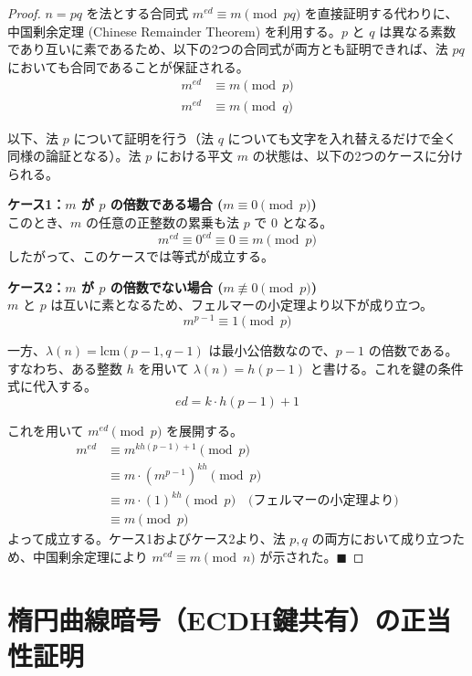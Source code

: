 \documentclass[11pt,a4paper]{ltjsarticle}
\newtheorem{proof}{証明}
\begin{document}
\begin{proof}
$n=pq$ を法とする合同式 $m^{ed} \equiv m \pmod{pq}$ を直接証明する代わりに、中国剰余定理 (Chinese Remainder Theorem) を利用する。$p$ と $q$ は異なる素数であり互いに素であるため、以下の2つの合同式が両方とも証明できれば、法 $pq$ においても合同であることが保証される。
\begin{align}
  m^{ed} &\equiv m \pmod{p} \\
  m^{ed} &\equiv m \pmod{q}
\end{align}

以下、法 $p$ について証明を行う（法 $q$ についても文字を入れ替えるだけで全く同様の論証となる）。法 $p$ における平文 $m$ の状態は、以下の2つのケースに分けられる。

\vspace{1em}
\noindent\textbf{ケース1：$m$ が $p$ の倍数である場合 ($m \equiv 0 \pmod{p}$)} \\
このとき、$m$ の任意の正整数の累乗も法 $p$ で $0$ となる。
\[ m^{ed} \equiv 0^{ed} \equiv 0 \equiv m \pmod{p} \]
したがって、このケースでは等式が成立する。

\vspace{1em}
\noindent\textbf{ケース2：$m$ が $p$ の倍数でない場合 ($m \not\equiv 0 \pmod{p}$)} \\
$m$ と $p$ は互いに素となるため、フェルマーの小定理より以下が成り立つ。
\[ m^{p-1} \equiv 1 \pmod{p} \]

一方、$\lambda(n) = \mathrm{lcm}(p-1, q-1)$ は最小公倍数なので、$p-1$ の倍数である。すなわち、ある整数 $h$ を用いて $\lambda(n) = h(p-1)$ と書ける。これを鍵の条件式に代入する。
\[ ed = k \cdot h(p-1) + 1 \]

これを用いて $m^{ed} \pmod{p}$ を展開する。
\begin{align*}
  m^{ed} &\equiv m^{kh(p-1) + 1} \pmod{p} \\
         &\equiv m \cdot (m^{p-1})^{kh} \pmod{p} \\
         &\equiv m \cdot (1)^{kh} \pmod{p} \quad \text{(フェルマーの小定理より)} \\
         &\equiv m \pmod{p}
\end{align*}
よって成立する。ケース1およびケース2より、法 $p, q$ の両方において成り立つため、中国剰余定理により $m^{ed} \equiv m \pmod{n}$ が示された。\hfill $\blacksquare$
\end{proof}


\section{楕円曲線暗号（ECDH鍵共有）の正当性証明}
\end{document}
